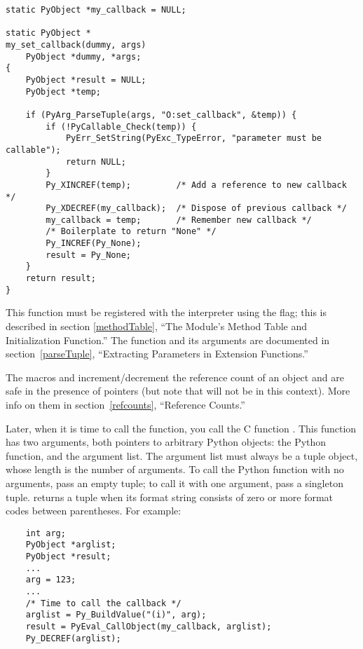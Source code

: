 \begin{verbatim}
static PyObject *my_callback = NULL;

static PyObject *
my_set_callback(dummy, args)
    PyObject *dummy, *args;
{
    PyObject *result = NULL;
    PyObject *temp;

    if (PyArg_ParseTuple(args, "O:set_callback", &temp)) {
        if (!PyCallable_Check(temp)) {
            PyErr_SetString(PyExc_TypeError, "parameter must be callable");
            return NULL;
        }
        Py_XINCREF(temp);         /* Add a reference to new callback */
        Py_XDECREF(my_callback);  /* Dispose of previous callback */
        my_callback = temp;       /* Remember new callback */
        /* Boilerplate to return "None" */
        Py_INCREF(Py_None);
        result = Py_None;
    }
    return result;
}
\end{verbatim}

This function must be registered with the interpreter using the
 flag; this is described in section
\ref{methodTable}, ``The Module's Method Table and Initialization
Function.''  The  function and its
arguments are documented in section~\ref{parseTuple}, ``Extracting
Parameters in Extension Functions.''

The macros  and 
increment/decrement the reference count of an object and are safe in
the presence of \NULL{} pointers (but note that  will not be 
\NULL{} in this context).  More info on them in
section~\ref{refcounts}, ``Reference Counts.''

Later, when it is time to call the function, you call the C function
.  This
function has two arguments, both pointers to arbitrary Python objects:
the Python function, and the argument list.  The argument list must
always be a tuple object, whose length is the number of arguments.  To
call the Python function with no arguments, pass an empty tuple; to
call it with one argument, pass a singleton tuple.
 returns a tuple when its format string
consists of zero or more format codes between parentheses.  For
example:

\begin{verbatim}
    int arg;
    PyObject *arglist;
    PyObject *result;
    ...
    arg = 123;
    ...
    /* Time to call the callback */
    arglist = Py_BuildValue("(i)", arg);
    result = PyEval_CallObject(my_callback, arglist);
    Py_DECREF(arglist);
\end{verbatim}

